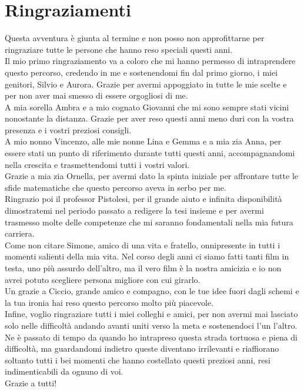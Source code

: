\documentclass[a4paper,11pt]{article}
\begin{document}
    \section{Ringraziamenti}
    Questa avventura è giunta al termine e non posso non approfittarne per ringraziare tutte le persone che hanno reso speciali questi anni.\\[0.1in]
    Il mio primo ringraziamento va a coloro che mi hanno permesso di intraprendere questo percorso, credendo in me e sostenendomi fin dal primo giorno, i miei genitori, Silvio e Aurora. Grazie per avermi appoggiato in tutte le mie scelte e per non aver mai smesso di essere orgogliosi di me. \\[0.1in]
    A mia sorella Ambra e a mio cognato Giovanni che mi sono sempre stati vicini nonostante la distanza. Grazie per aver reso questi anni meno duri con la vostra presenza e i vostri preziosi consigli.\\[0.1in]
    A mio nonno Vincenzo, alle mie nonne Lina e Gemma e a mia zia Anna, per essere stati un punto di riferimento durante tutti questi anni, accompagnandomi nella crescita e trasmettendomi tutti i vostri valori.\\[0.1in]
    Grazie a mia zia Ornella, per avermi dato la spinta iniziale per affrontare tutte le sfide matematiche che questo percorso aveva in serbo per me.\\[0.1in]
    Ringrazio poi il professor Pistolesi, per il grande aiuto e infinita disponibilità dimostratemi nel periodo passato a redigere la tesi insieme e per avermi trasmesso molte delle competenze che mi saranno fondamentali nella mia futura carriera.\\[0.1in]
    Come non citare Simone, amico di una vita e fratello, onnipresente in tutti i momenti salienti della mia vita. Nel corso degli anni ci siamo fatti tanti film in testa, uno più assurdo dell’altro, ma il vero film è la nostra amicizia e io non avrei potuto scegliere persona migliore con cui girarlo.\\[0.1in]
    Un grazie a Ciccio, grande amico e compagno, con le tue idee fuori dagli schemi e la tua ironia hai reso questo percorso molto più piacevole.\\[0.1in]
    Infine, voglio ringraziare tutti i miei colleghi e amici, per non avermi mai lasciato solo nelle difficoltà andando avanti uniti verso la meta e sostenendoci l’un l’altro.\\[0.1in]
    Ne è passato di tempo da quando ho intrapreso questa strada tortuosa e piena di difficoltà, ma guardandomi indietro queste diventano irrilevanti e riaffiorano soltanto tutti i bei momenti che hanno costellato questi preziosi anni, resi indimenticabili da ognuno di voi.\\[0.1in]
    Grazie a tutti!
    
\end{document}
